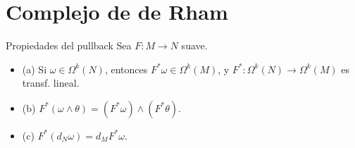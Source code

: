 \section{Complejo de de Rham}
\begin{bookproposition}{Propiedades del pullback}
Sea $F:M\to N$ suave.

\begin{itemize}
\item (a) Si $\omega\in\Omega^k(N)$, entonces $F^*\omega\in\Omega^k(M)$, y $F^*:\Omega^k(N)\to\Omega^k(M)$ es transf. lineal.
\item (b) $F^*(\omega\wedge\theta)=(F^*\omega)\wedge(F^*\theta)$.
\item (c) $F^*(d_N\omega)=d_MF^*\omega$.
\end{itemize}
\end{bookproposition}
